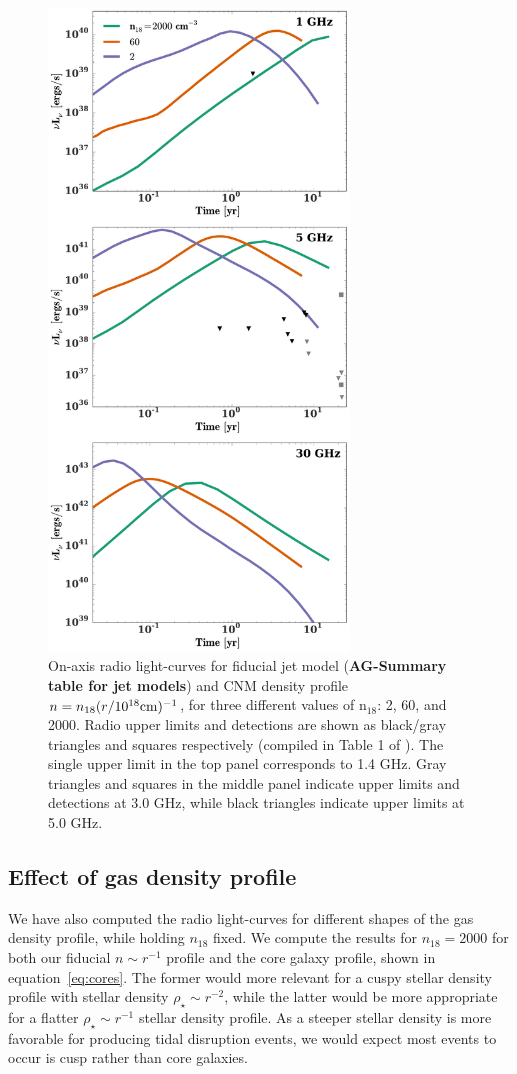 \documentclass[usenatbib,fleqn]{mnras}
\begin{document}
\begin{figure} 
  \includegraphics[width=8cm]{lightcurves.pdf}
  \caption{\label{fig:upper_limits} On-axis radio light-curves for
    fiducial jet model ({\bf AG-Summary table for jet models}) and CNM
    density profile $n=n_{18} (r/10^{18} {\rm cm})^{-1}$, for three
    different values of n$_{18}$: 2, 60, and 2000. Radio upper limits
    and detections are shown as black/gray triangles and squares
    respectively (compiled in Table 1 of \citealt{Mimica+2015}). The
    single upper limit in the top panel corresponds to 1.4 GHz. Gray
    triangles and squares in the middle panel indicate upper limits
    and detections at 3.0 GHz, while black triangles indicate upper
    limits at 5.0 GHz.}
\end{figure}

\subsection{Effect of gas density profile}
We have also computed the radio light-curves for different shapes of
the gas density profile, while holding $n_{18}$ fixed. We compute the
results for $n_{18}=2000$ for both our fiducial $n\sim r^{-1}$ profile and
the core galaxy profile, shown in equation~\eqref{eq:cores}. The
former would more relevant for a cuspy stellar density profile with
stellar density $\rho_{\star}\sim r^{-2}$, while the latter would be more
appropriate for a flatter $\rho_{\star}\sim r^{-1}$ stellar density
profile. As a steeper stellar density is more favorable for producing
tidal disruption events, we would expect most events to occur is cusp
rather than core galaxies.
\end{document}

